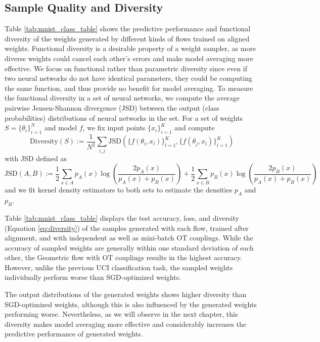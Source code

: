 \subsection{Sample Quality and Diversity}

Table \ref{tab:mnist_class_table} shows the predictive performance and functional diversity of the weights generated by different kinds of flows trained on aligned weights. Functional diversity is a desirable property of a weight sampler, as more diverse weights could cancel each other's errors and make model averaging more effective. We focus on functional rather than parametric diversity since even if two neural networks do not have identical parameters, they could be computing the same function, and thus provide no benefit for model averaging. To measure the functional diversity in a set of neural networks, we compute the average pairwise Jensen-Shannon divergence (JSD) \citep{endresNewMetricProbability2003,mishtalJensenShannonDivergenceEnsembles2012} between the output (class probabilities) distributions of neural networks in the set. For a set of weights $S = \{ \theta_i \}_{i=1}^N$ and model $f$, we fix input points $\{ x_i \}_{i=1}^K$ and compute
\begin{equation} \label{eq:diversity}
    \text{Diversity}(S) := \frac{1}{N^2} \sum_{i, j} \text{JSD}\left(
        \{ f(\theta_i, x_l)\}_{l=1}^K, 
        \{f(\theta_j, x_l)\}_{l=1}^K
    \right)
\end{equation}
with JSD defined as 
\begin{equation}
    \text{JSD}(A, B) := 
    \frac{1}{2} \sum_{x \in A} p_A(x) \log \left( \frac{2p_A(x)}{p_A(x) + p_B(x)} \right) + 
    \frac{1}{2} \sum_{x \in B} p_B(x) \log \left( \frac{2p_B(x)}{p_A(x) + p_B(x)} \right)
\end{equation}
and we fit kernel density estimators to both sets to estimate the densities $p_A$ and $p_B$. 

Table \ref{tab:mnist_class_table} displays the test accuracy, loss, and diversity (Equation \ref{eq:diversity}) of the samples generated with each flow, trained after alignment, and with independent as well as mini-batch OT couplings. While the accuracy of sampled weights are generally within one standard deviation of each other, the Geometric flow with OT couplings results in the highest accuracy. However, unlike the previous UCI classification task, the sampled weights individually perform worse than SGD-optimized weights. 

The output distributions of the generated weights shows higher diversity than SGD-optimized weights, although this is also influenced by the generated weights performing worse. Nevertheless, as we will observe in the next chapter, this diversity makes model averaging more effective and considerably increases the predictive performance of generated weights. 

